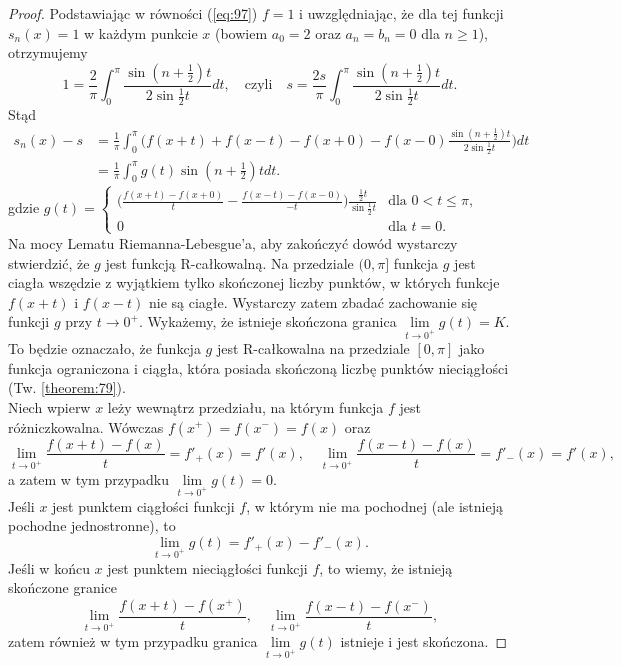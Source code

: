 \documentclass[leqno]{article}
\begin{document}
\begin{justify}
\begin{proof}
    Podstawiając w równości (\ref{eq:97}) $f = 1$ i uwzględniając, że dla tej funkcji $s_n(x) = 1$ w każdym punkcie $x$ (bowiem $a_0 = 2$ oraz $a_n = b_n = 0$ dla $n \geqslant 1$), otrzymujemy 
    \[
        1 = \frac{2}{\pi}\int_{0}^{\pi}\frac{\sin (n + \frac{1}{2})t}{2 \sin \frac{1}{2}t}dt, \quad \text{czyli} \quad s = \frac{2s}{\pi}\int_{0}^{\pi}\frac{\sin (n + \frac{1}{2})t}{2 \sin \frac{1}{2}t}dt.
    \]
    Stąd
    \begin{align*}
        s_n(x) - s &= \frac{1}{\pi} \int_{0}^{\pi}\Bigg ( f(x + t) + f(x - t) - f(x + 0) - f(x - 0) \frac{\sin (n + \frac{1}{2})t}{2 \sin \frac{1}{2}t} \Bigg)dt \\ 
                    &= \frac{1}{\pi} \int_{0}^{\pi}g(t) \sin (n + \frac{1}{2})t dt.
    \end{align*}
    gdzie $g(t) = \begin{cases} 
       \Big( \frac{f(x + t) - f(x + 0)}{t} - \frac{f(x - t) - f(x - 0)}{-t}\Big) \frac{\frac{1}{2}t}{\sin \frac{1}{2}t} & \text{dla } 0 < t \leqslant \pi, \\    
       0 & \text{dla } t = 0. 
    \end{cases}$ \\
    Na mocy Lematu Riemanna-Lebesgue'a, aby zakończyć dowód wystarczy stwierdzić, że $g$ jest funkcją R-całkowalną. Na przedziale $(0, \pi]$ funkcja $g$ jest ciagła wszędzie z wyjątkiem
    tylko skończonej liczby punktów, w których funkcje $f(x + t)$ i $f(x - t)$ nie są ciagłe. Wystarczy zatem zbadać zachowanie się funkcji $g$ przy $t \to 0^+$. 
    Wykażemy, że istnieje skończona granica $\lim\limits_{t \to 0^+}g(t) = K$. To będzie oznaczało, że funkcja $g$ jest R-całkowalna na przedziale $[0, \pi]$ jako funkcja ograniczona i 
    ciągła, która posiada skończoną liczbę punktów nieciągłości (Tw. \ref{theorem:79}). \\
    Niech wpierw $x$ leży wewnątrz przedziału, na którym funkcja $f$ jest różniczkowalna. Wówczas $f(x^+) = f(x^-) = f(x)$ oraz 
    \[
        \lim_{t \to 0^+}\frac{f(x + t) - f(x)}{t}=f'_+(x) = f'(x), \quad \lim_{t \to 0^+}\frac{f(x - t) - f(x)}{t} = f'_-(x) = f'(x),
    \]
    a zatem w tym przypadku $\lim\limits_{t \to 0^+}g(t) = 0$. \\
    Jeśli $x$ jest punktem ciągłości funkcji $f$, w którym nie ma pochodnej (ale istnieją pochodne jednostronne), to 
    \[
        \lim_{t \to 0^+}g(t) = f'_+(x) - f'_-(x).
    \]
    Jeśli w końcu $x$ jest punktem nieciągłości funkcji $f$, to wiemy, że istnieją skończone granice
    \[
        \lim_{t \to 0^+}\frac{f(x + t) - f(x^+)}{t}, \quad \lim_{t \to 0^+}\frac{f(x - t) - f(x^-)}{t},
    \]
    zatem również w tym przypadku granica  $\lim\limits_{t \to 0^+}g(t)$ istnieje i jest skończona. 
\end{proof}


\end{justify}
\end{document}
